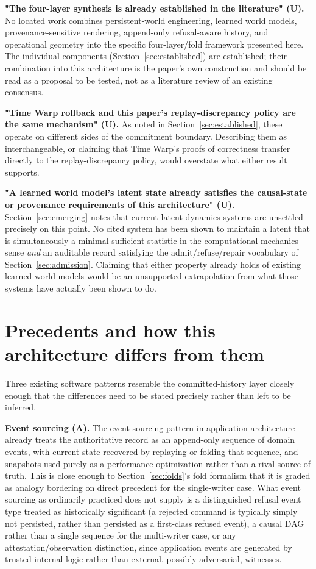 \documentclass[11pt]{article}
\begin{document}
\textbf{"The four-layer synthesis is already established in the literature" (U).} No located work combines persistent-world engineering, learned world models, provenance-sensitive rendering, append-only refusal-aware history, and operational geometry into the specific four-layer/fold framework presented here. The individual components (Section~\ref{sec:established}) are established; their combination into this architecture is the paper's own construction and should be read as a proposal to be tested, not as a literature review of an existing consensus.

\textbf{"Time Warp rollback and this paper's replay-discrepancy policy are the same mechanism" (U).} As noted in Section~\ref{sec:established}, these operate on different sides of the commitment boundary. Describing them as interchangeable, or claiming that Time Warp's proofs of correctness transfer directly to the replay-discrepancy policy, would overstate what either result supports.

\textbf{"A learned world model's latent state already satisfies the causal-state or provenance requirements of this architecture" (U).} Section~\ref{sec:emerging} notes that current latent-dynamics systems are unsettled precisely on this point. No cited system has been shown to maintain a latent that is simultaneously a minimal sufficient statistic in the computational-mechanics sense \emph{and} an auditable record satisfying the admit/refuse/repair vocabulary of Section~\ref{sec:admission}. Claiming that either property already holds of existing learned world models would be an unsupported extrapolation from what those systems have actually been shown to do.

\section{Precedents and how this architecture differs from them}
\label{sec:precedents}

Three existing software patterns resemble the committed-history layer closely enough that the differences need to be stated precisely rather than left to be inferred.

\textbf{Event sourcing (A).} The event-sourcing pattern in application architecture already treats the authoritative record as an append-only sequence of domain events, with current state recovered by replaying or folding that sequence, and snapshots used purely as a performance optimization rather than a rival source of truth. This is close enough to Section~\ref{sec:folds}'s fold formalism that it is graded as analogy bordering on direct precedent for the single-writer case. What event sourcing as ordinarily practiced does not supply is a distinguished refusal event type treated as historically significant (a rejected command is typically simply not persisted, rather than persisted as a first-class refused event), a causal DAG rather than a single sequence for the multi-writer case, or any attestation/observation distinction, since application events are generated by trusted internal logic rather than external, possibly adversarial, witnesses.
\end{document}
